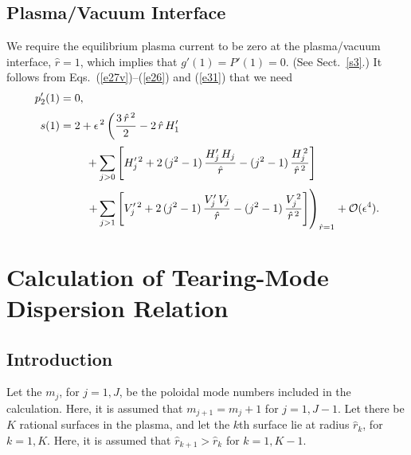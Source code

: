 \documentclass[12pt,prb,aps]{revtex4-1}
\begin{document}
\subsection{Plasma/Vacuum Interface}
We require the equilibrium plasma current to be zero at the plasma/vacuum interface, $\hat{r}=1$, which
implies that $g'(1)=P'(1)= 0$. (See Sect.~\ref{s3}.) It follows from Eqs.~(\ref{e27v})--(\ref{e26}) and (\ref{e31}) that we need\,\cite{am1}
\begin{align}
p_2'(1) &= 0,\label{e222}\\[0.5ex]
s(1) &= 2+ \epsilon^{\,2}\left(\frac{3\,\hat{r}^{\,2}}{2}-2\,\hat{r}\,H_1'\right.\nonumber\\[0.5ex]
&\phantom{===}
+\sum_{j>0}\left[H_j'^{\,2}+2\,(j^2-1)\,\frac{H_j'\,H_j}{\hat{r}}-(j^2-1)\,\frac{H_j^{\,2}}{\hat{r}^{\,2}}\right]\nonumber\\[0.5ex]
&\phantom{===}\left.+\sum_{j>1}\left[V_j'^{\,2}+2\,(j^2-1)\,\frac{V_j'\,V_j}{\hat{r}}-(j^2-1)\,\frac{V_j^{\,2}}{\hat{r}^{\,2}}\right]\right)_{\hat{r}=1}
+{\cal O}(\epsilon^4).\label{e223}
\end{align}


\section{Calculation of  Tearing-Mode Dispersion Relation}
\subsection{Introduction}
Let the $m_j$, for $j=1,J$, be the poloidal mode numbers included in the calculation. Here, it is assumed that $m_{j+1}=m_j+1$ for $j=1,J-1$. 
Let there be $K$ rational surfaces in the plasma, and let the $k$th surface lie at radius $\hat{r}_k$, for $k=1,K$. Here,
it is assumed that $\hat{r}_{k+1}>\hat{r}_k$ for $k=1,K-1$. 
\end{document}
